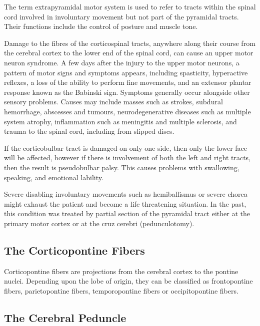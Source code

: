 The term extrapyramidal motor system is used to refer to tracts within the spinal cord involved in involuntary movement but not part of the pyramidal tracts. Their functions include the control of posture and muscle tone.

Damage to the fibres of the corticospinal tracts, anywhere along their course from the cerebral cortex to the lower end of the spinal cord, can cause an upper motor neuron syndrome. A few days after the injury to the upper motor neurons, a pattern of motor signs and symptoms appears, including spasticity, hyperactive reflexes, a loss of the ability to perform fine movements, and an extensor plantar response known as the Babinski sign. Symptoms generally occur alongside other sensory problems. Causes may include masses such as strokes, subdural hemorrhage, abscesses and tumours, neurodegenerative diseases such as multiple system atrophy, inflammation such as meningitis and multiple sclerosis, and trauma to the spinal cord, including from slipped discs.

If the corticobulbar tract is damaged on only one side, then only the lower face will be affected, however if there is involvement of both the left and right tracts, then the result is pseudobulbar palsy. This causes problems with swallowing, speaking, and emotional lability.

Severe disabling involuntary movements such as hemiballismus or severe chorea might exhaust the patient and become a life threatening situation. In the past, this condition was treated by partial section of the pyramidal tract either at the primary motor cortex or at the cruz cerebri (pedunculotomy).

\hypertarget{the-corticopontine-fibers}{%
\subsection{The Corticopontine Fibers}\label{the-corticopontine-fibers}}

Corticopontine fibers are projections from the cerebral cortex to the pontine nuclei. Depending upon the lobe of origin, they can be classified as frontopontine fibers, parietopontine fibers, temporopontine fibers or occipitopontine fibers.

\hypertarget{the-cerebral-peduncle}{%
\subsection{The Cerebral Peduncle}\label{the-cerebral-peduncle}}

